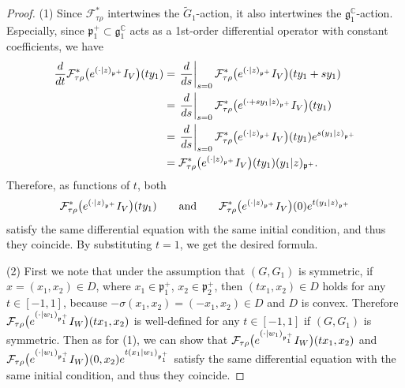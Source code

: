 \documentclass[11pt]{article}
\numberwithin{equation}{section}
\newcommand{\BC}{\mathbb{C}}
\newcommand{\fg}{\mathfrak{g}}
\newcommand{\fp}{\mathfrak{p}}
\newcommand{\cF}{\mathcal{F}}
\begin{document}
\begin{proof}
(1) Since $\cF_{\tau\rho}^*$ intertwines the $\tilde{G}_1$-action, it also intertwines the $\fg^\BC_1$-action.
Especially, since $\fp^+_1\subset \fg^\BC_1$ acts as a 1st-order differential operator with constant coefficients, we have
\begin{align*}
\frac{{\rm d}}{{\rm d}t}\cF_{\tau\rho}^*\big({\rm e}^{(\cdot|z)_{\fp^+}}I_V\big)(ty_1)
&=\left.\frac{{\rm d}}{{\rm d}s}\right|_{s=0}\cF_{\tau\rho}^*\big({\rm e}^{(\cdot|z)_{\fp^+}}I_V\big)(ty_1+sy_1) \\
&=\left.\frac{{\rm d}}{{\rm d}s}\right|_{s=0}\cF_{\tau\rho}^*\big({\rm e}^{(\cdot+sy_1|z)_{\fp^+}}I_V\big)(ty_1)\\
& =\left.\frac{{\rm d}}{{\rm d}s}\right|_{s=0}\cF_{\tau\rho}^*\big({\rm e}^{(\cdot|z)_{\fp^+}}I_V\big)(ty_1){\rm e}^{s(y_1|z)_{\fp^+}} \\
&=\cF_{\tau\rho}^*\big({\rm e}^{(\cdot|z)_{\fp^+}}I_V\big)(ty_1)(y_1|z)_{\fp^+}.
\end{align*}
Therefore, as functions of $t$, both
\begin{gather*} \cF_{\tau\rho}^*\big({\rm e}^{(\cdot|z)_{\fp^+}}I_V\big)(ty_1)\qquad \text{and} \qquad
\cF_{\tau\rho}^*\big({\rm e}^{(\cdot|z)_{\fp^+}}I_V\big)(0){\rm e}^{t(y_1|z)_{\fp^+}} \end{gather*}
satisfy the same differential equation with the same initial condition, and thus they coincide.
By substituting $t=1$, we get the desired formula.

(2) First we note that under the assumption that $(G,G_1)$ is symmetric,
if $x=(x_1,x_2)\in D$, where $x_1\in\fp^+_1$, $x_2\in\fp^+_2$, then $(tx_1,x_2)\in D$ holds for any $t\in[-1,1]$,
because $-\sigma(x_1,x_2)=(-x_1,x_2)\in D$ and $D$ is convex.
Therefore $\cF_{\tau\rho}\big({\rm e}^{(\cdot|w_1)_{\fp^+_1}}I_W\big)(tx_1,x_2)$ is well-defined for any $t\in[-1,1]$ if $(G,G_1)$ is symmetric.
Then as for (1), we can show that $\cF_{\tau\rho}\big({\rm e}^{(\cdot|w_1)_{\fp^+_1}}I_W\big)(tx_1,x_2)$ and
$\cF_{\tau\rho}\big({\rm e}^{(\cdot|w_1)_{\fp^+_1}}I_W\big)(0,x_2){\rm e}^{t(x_1|w_1)_{\fp^+_1}}$ satisfy the same differential equation
with the same initial condition, and thus they coincide.
\end{proof}
\end{document}
